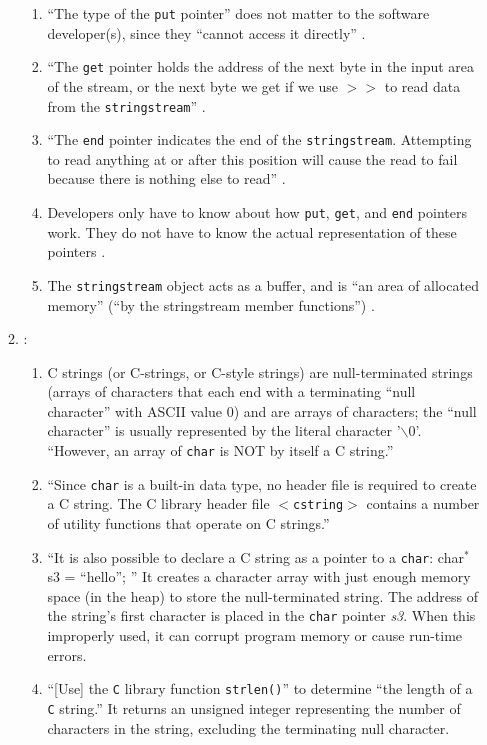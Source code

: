\begin{enumerate}
\begin{enumerate}
\begin{enumerate}
		\item ``The type of the {\tt put} pointer'' does not matter to the software developer(s), since they ``cannot access it directly'' \cite[\S9.8]{Heller2003}.
		\item ``The {\tt get} pointer holds the address of the next byte in the input area of the stream, or the next byte we get if we use $>>$ to read data from the {\tt stringstream}'' \cite[\S9.9]{Heller2003}.
		\item ``The {\tt end} pointer indicates the end of the {\tt stringstream}. Attempting to read anything at or after this position will cause the read to fail because there is nothing else to read'' \cite[\S9.9]{Heller2003}.
		\item Developers only have to know about how {\tt put}, {\tt get}, and {\tt end} pointers work. They do not have to know the actual representation of these pointers \cite[\S9.9]{Heller2003}.
		\item The {\tt stringstream} object acts as a buffer, and is ``an area of allocated memory'' (``by the stringstream member functions'') \cite[\S9.9]{Heller2003}.
		\end{enumerate}
	\item \cite{McMahon20XY}: \vspace{-0.2cm}
		\begin{enumerate} \itemsep -2pt
		\item C strings (or C-strings, or C-style strings) are null-terminated strings (arrays of characters that each end with a terminating ``null character'' with ASCII value 0) and are arrays of characters; the ``null character'' is usually represented by the literal character '$\backslash$0'. ``However, an array of {\tt char} is NOT by itself a C string.''
		\item ``Since {\tt char} is a built-in data type, no header file is required to create a C string. The C library header file $<${\tt cstring}$>$ contains a number of utility functions that operate on C strings.''
		\item ``It is also possible to declare a C string as a pointer to a {\tt char}: char$^{\ast}$ s3 = ``hello''; '' It creates a character array with just enough memory space (in the heap) to store the null-terminated string. The address of the string's first character is placed in the {\tt char} pointer {\it s3}. When this improperly used, it can corrupt program memory or cause run-time errors.
		\item ``[Use] the {\tt C} library function {\tt strlen()}'' to determine ``the length of a {\tt C} string.'' It returns an unsigned integer representing the number of characters in the string, excluding the terminating null character.

\end{enumerate}
\end{enumerate}
\end{enumerate}
